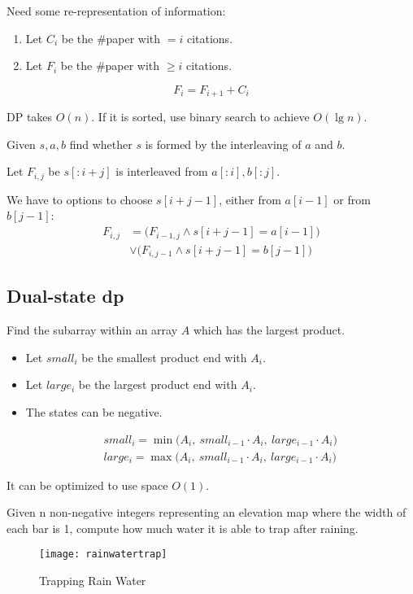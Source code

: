 {Need some re-representation of information: 
\begin{enumerate}
\item Let $C_i$ be the \#paper with $=i$ citations.
\item Let $F_i$ be the \#paper with $\geq i$ citations.
\end{enumerate}
$$
F_i = F_{i+1} + C_i
$$

DP takes $O(n)$. If it is sorted, use binary search to achieve $O(\lg n)$.

 Given $s, a, b$ find whether $s$ is formed by the interleaving
of $a$ and $b$.

Let $F_{i,j}$ be $s[:i+j]$ is interleaved from $a[:i], b[:j]$.

We have to options to choose $s[i+j-1]$, either from $a[i-1]$ or from $b[j-1]$:
\begin{align*}
F_{i,j} &= \Big(F_{i-1, j} \wedge s[i+j-1] = a[i-1]\Big) \\
& \vee \Big(F_{i,j-1} \wedge s[i+j-1] = b[j-1]\Big)
\end{align*}

\subsection{Dual-state dp}
 Find the subarray within an array $A$ which has the largest product. 
\begin{itemize}
\item Let $small_i$ be the smallest product end with $A_i$. 
\item Let $large_i$ be the largest product end with $A_i$.
\item The states can be negative. 
\end{itemize}
\begin{eqnarray*}
&& small_i = \min\Big( A_i,\ small_{i-1}\cdot A_i,\ large_{i-1}\cdot A_i \Big)
\nonumber \\
&& large_i = \max\Big( A_i,\ small_{i-1}\cdot A_i,\ large_{i-1}\cdot A_i \Big)
\end{eqnarray*}

It can be optimized to use space $O(1)$. 

Given n non-negative integers representing an elevation map where the width of each
bar is 1, compute how much water it is able to trap after raining.
\begin{figure}[]
    \centerline{\texttt{[image: rainwatertrap]}}
    \caption{Trapping Rain Water}
  \label{fig:rainwatertrap}
\end{figure}

}
